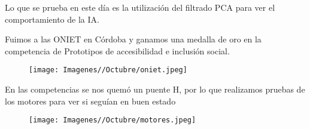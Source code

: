 \documentclass{article}
\begin{document}
Lo que se prueba en este día es la utilización del filtrado PCA para ver el comportamiento de la IA.

\newpage

Fuimos a las ONIET en Córdoba y ganamos una medalla de oro en la competencia de Prototipos de accesibilidad e inclusión social.

\begin{figure}[H]
    \centering
    \texttt{[image: Imagenes//Octubre/oniet.jpeg]}
\end{figure}


En las competencias se nos quemó un puente H, por lo que realizamos pruebas de los motores para ver si seguían en buen estado

\begin{figure}[H]
    \centering
    \texttt{[image: Imagenes//Octubre/motores.jpeg]}
\end{figure}

\newpage
\end{document}
